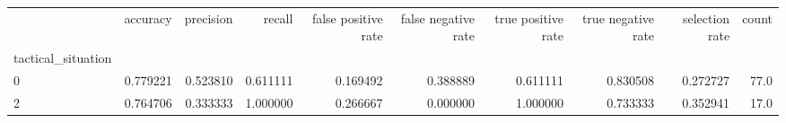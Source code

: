 \begin{tabular}{lrrrrrrrrr}
\toprule
{} &  accuracy &  precision &    recall &  false positive rate &  false negative rate &  true positive rate &  true negative rate &  selection rate &  count \\
tactical\_situation &           &            &           &                      &                      &                     &                     &                 &        \\
\midrule
0                  &  0.779221 &   0.523810 &  0.611111 &             0.169492 &             0.388889 &            0.611111 &            0.830508 &        0.272727 &   77.0 \\
2                  &  0.764706 &   0.333333 &  1.000000 &             0.266667 &             0.000000 &            1.000000 &            0.733333 &        0.352941 &   17.0 \\
\bottomrule
\end{tabular}
